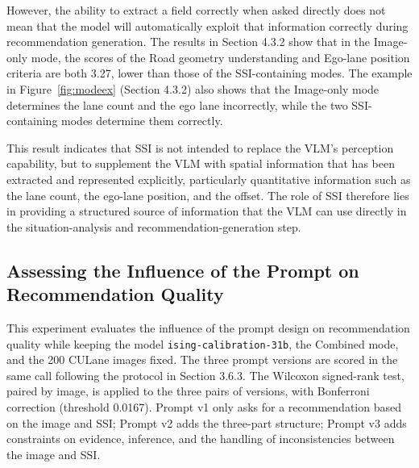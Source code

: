 \documentclass[12pt,a4paper]{report}
\begin{document}
However, the ability to extract a field correctly when asked directly does not mean that the model will automatically exploit that information correctly during recommendation generation. The results in Section 4.3.2 show that in the Image-only mode, the scores of the Road geometry understanding and Ego-lane position criteria are both 3.27, lower than those of the SSI-containing modes. The example in Figure~\ref{fig:modeex} (Section 4.3.2) also shows that the Image-only mode determines the lane count and the ego lane incorrectly, while the two SSI-containing modes determine them correctly.

This result indicates that SSI is not intended to replace the VLM's perception capability, but to supplement the VLM with spatial information that has been extracted and represented explicitly, particularly quantitative information such as the lane count, the ego-lane position, and the offset. The role of SSI therefore lies in providing a structured source of information that the VLM can use directly in the situation-analysis and recommendation-generation step.

\subsection{Assessing the Influence of the Prompt on Recommendation Quality}

This experiment evaluates the influence of the prompt design on recommendation quality while keeping the model \texttt{ising-calibration-31b}, the Combined mode, and the 200 CULane images fixed. The three prompt versions are scored in the same call following the protocol in Section 3.6.3. The Wilcoxon signed-rank test, paired by image, is applied to the three pairs of versions, with Bonferroni correction (threshold 0.0167). Prompt v1 only asks for a recommendation based on the image and SSI; Prompt v2 adds the three-part structure; Prompt v3 adds constraints on evidence, inference, and the handling of inconsistencies between the image and SSI.
\end{document}
